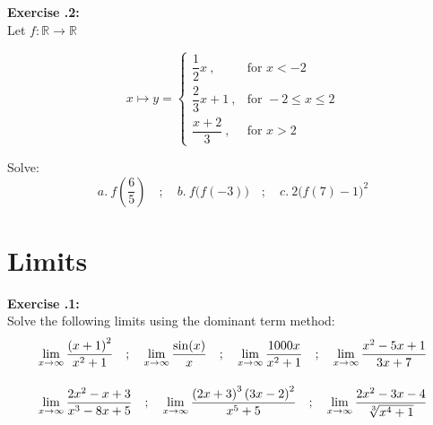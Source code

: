 \documentclass{article}
\newcommand{\exercise}[2][]{%
  \par\noindent\textbf{Exercise \thesection.#1:\\} #2\par \vspace*{.25cm}
}
\begin{document}
\exercise[2]{
  Let $f: \mathbb{R} \to \mathbb{R}$

  \[x \mapsto y =
    \begin{cases}
      \dfrac{1}{2}x\ , &\text{for } x < -2\\[2.5ex]
      \dfrac{2}{3}x + 1\ , &\text{for } -2 \leq x \leq 2\\[2.5ex]
      \dfrac{x+2}{3}\ , &\text{for } x > 2
    \end{cases}
  \]

  Solve:
  \[
    a.\ f\left(\frac{6}{5}\right)\quad ; \quad
    b.\ f\big(f\left(-3\right)\big)\quad ; \quad
    c.\ 2\big(f\left(7\right)-1\big)^2
  \]
}

\section{Limits}
\exercise[1]{
  Solve the following limits using the dominant term method:
  \begin{gather*} \displaystyle
    \lim_{x\to\infty} \frac{\left(x+1\right)^2}{x^2+1}\quad ; \quad \lim_{x\to\infty} \frac{\sin(x)}{x}\quad ; \quad \lim_{x\to\infty} \frac{1000x}{x^2+1}\quad ; \quad \lim_{x\to\infty} \frac{x^2-5x+1}{3x+7}\\[2.5ex]
    \lim_{x\to\infty} \frac{2x^2-x+3}{x^3-8x+5}\quad ; \quad \lim_{x\to\infty} \frac{\left(2x+3\right)^3\left(3x-2\right)^2}{x^5+5}\quad ; \quad \lim_{x\to\infty} \frac{2x^2-3x-4}{\sqrt[3]{x^4+1}}
  \end{gather*}
}
\end{document}
